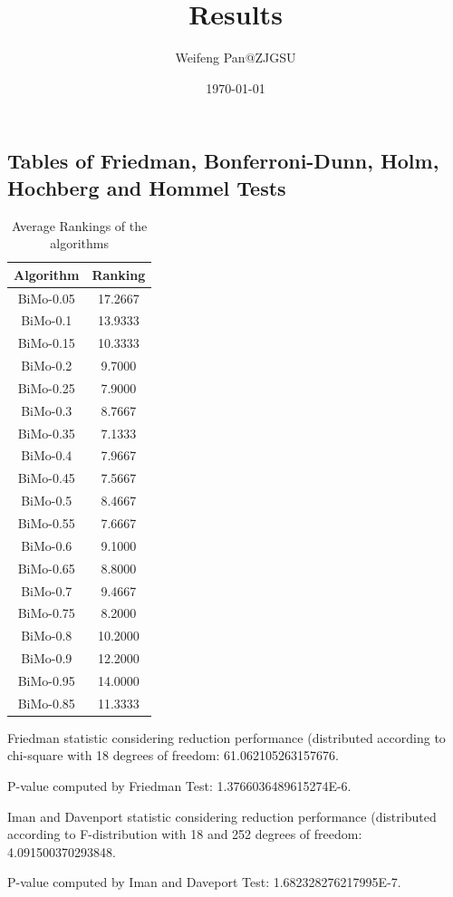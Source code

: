 \documentclass[a4paper,10pt]{article}
\title{Results}
\author{Weifeng Pan@ZJGSU}
\date{\today}
\begin{document}
\begin{landscape}
\oddsidemargin 0in \topmargin 0in\maketitle
\section{Tables of Friedman, Bonferroni-Dunn, Holm, Hochberg and Hommel Tests}
\begin{table}[!htp]
\centering
\caption{Average Rankings of the algorithms
}\begin{tabular}{c|c}
Algorithm&Ranking\\
\hline
BiMo-0.05&17.2667\\
BiMo-0.1&13.9333\\
BiMo-0.15&10.3333\\
BiMo-0.2&9.7000\\
BiMo-0.25&7.9000\\
BiMo-0.3&8.7667\\
BiMo-0.35&7.1333\\
BiMo-0.4&7.9667\\
BiMo-0.45&7.5667\\
BiMo-0.5&8.4667\\
BiMo-0.55&7.6667\\
BiMo-0.6&9.1000\\
BiMo-0.65&8.8000\\
BiMo-0.7&9.4667\\
BiMo-0.75&8.2000\\
BiMo-0.8&10.2000\\
BiMo-0.9&12.2000\\
BiMo-0.95&14.0000\\
BiMo-0.85&11.3333\\
\end{tabular}
\end{table}


Friedman statistic considering reduction performance (distributed according to chi-square with 18 degrees of freedom: 61.062105263157676.


P-value computed by Friedman Test: 1.3766036489615274E-6.\newline

Iman and Davenport statistic considering reduction performance (distributed according to F-distribution with 18 and 252 degrees of freedom: 4.091500370293848.


P-value computed by Iman and Daveport Test: 1.682328276217995E-7.\newline


\end{landscape}
\end{document}
